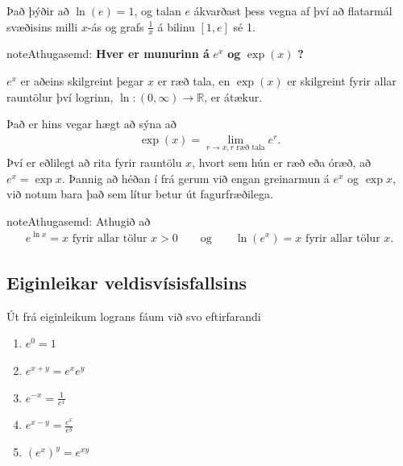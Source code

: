 \documentclass[a4paper,10pt,icelandic]{sphinxmanual}
\begin{document}
Það þýðir að \(\ln(e)=1\), og talan \(e\) ákvarðast þess vegna
af því að flatarmál svæðisins milli \(x\)-ás og grafs
\(\frac 1x\) á bilinu \([1,e]\) sé 1.


\begin{notice}{note}{Athugasemd:}
\textbf{Hver er munurinn á} \(e^x\) \textbf{og} \(\exp(x)\) \textbf{?}

\(e^x\) er aðeins skilgreint þegar \(x\) er ræð tala, en
\(\exp(x)\) er skilgreint fyrir allar rauntölur því logrinn,
\(\ln:(0,\infty)\to {{\mathbb  R}}\), er átækur.

Það er hins vegar hægt að sýna að
\begin{equation*}
\begin{split}\exp(x)=\lim_{r\to x, r\text{ ræð tala}} e^r.\end{split}
\end{equation*}
Því er eðlilegt að rita fyrir rauntölu \(x\), hvort sem hún er ræð
eða óræð, að \(e^x=\exp x\). Þannig að héðan í frá gerum við engan
greinarmun á \(e^x\) og \(\exp x\), við notum bara það sem lítur
betur út fagurfræðilega.
\end{notice}

\begin{notice}{note}{Athugasemd:}
Athugið að
\begin{equation*}
\begin{split}e^{\ln x}=x \mbox{ fyrir allar tölur }x>0\qquad \mbox{og}
\qquad \ln(e^x)=x  \mbox{ fyrir allar tölur }x.\end{split}
\end{equation*}\end{notice}


\subsection{Eiginleikar veldisvísisfallsins}
\label{kafli04:eiginleikar-veldisvisisfallsins}
Út frá eiginleikum lograns fáum við svo eftirfarandi
\begin{enumerate}
\item {} 
\(e^0=1\)

\item {} 
\(e^{x+y}=e^x e^y\)

\item {} 
\(e^{-x}=\frac{1}{e^x}\)

\item {} 
\(e^{x-y}=\frac{e^x}{e^y}\)

\item {} 
\(\left(e^x\right)^y=e^{xy}\)

\end{enumerate}
\end{document}
